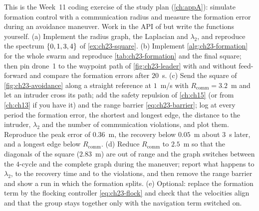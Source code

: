 \begin{exercise}
\label{exr:ch23-coding}
This is the Week~11 coding exercise of the study plan (\cref{ch:appA}):
simulate formation control with a communication radius and measure the
formation error during an avoidance maneuver. Work in the API of
 but write the functions yourself.
(a) Implement the radius graph, the Laplacian and $\lambda_2$, and reproduce
the spectrum $\left\{ 0, 1, 3, 4 \right\}$ of \cref{ex:ch23-square}. (b) Implement
\cref{alg:ch23-formation} for the whole swarm and reproduce
\cref{tab:ch23-formation} and the final square; then pin drone~1 to the
waypoint path of \cref{fig:ch23-leader} with and without feed-forward and
compare the formation errors after $20$~s. (c) Send the square of
\cref{fig:ch23-avoidance} along a straight reference at $1$~m/s with
$R_{\mathrm{comm}} = 3.2$~m and let an intruder cross its path; add the safety
repulsion of \cref{ch:ch15} (or \orca from \cref{ch:ch13} if you have it) and
the range barrier \cref{eq:ch23-barrier}; log at every period the formation
error, the shortest and longest edge, the distance to the intruder,
$\lambda_2$ and the number of communication violations, and plot them.
Reproduce the peak error of $0.36$~m, the recovery below $0.05$~m about $3$~s
later, and a longest edge below $R_{\mathrm{comm}}$. (d) Reduce
$R_{\mathrm{comm}}$ to $2.5$~m so that the diagonals of the square
($2.83$~m) are out of range and the graph switches between the $4$-cycle and
the complete graph during the maneuver; report what happens to $\lambda_2$,
to the recovery time and to the violations, and then remove the range barrier
and show a run in which the formation splits. (e) Optional: replace the
formation term by the flocking controller \cref{eq:ch23-flock} and check that
the velocities align and that the group stays together only with the
navigation term switched on.
\end{exercise}

